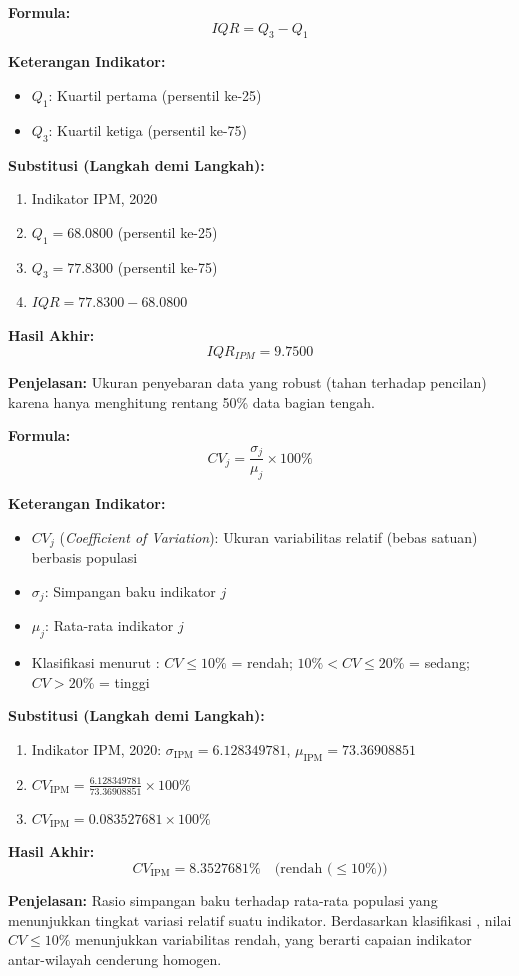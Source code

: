 \documentclass[11pt,a4paper]{article}
\begin{document}
\begin{tcolorbox}[formula_box, title={Jangkauan Interkuartil (IQR)}] \label{kotak:iqr}
\textbf{Formula:}
\[ IQR = Q_3 - Q_1 \]

\textbf{Keterangan Indikator:}
\begin{itemize}
  \item $Q_1$: Kuartil pertama (persentil ke-25)
  \item $Q_3$: Kuartil ketiga (persentil ke-75)
\end{itemize}

\textbf{Substitusi (Langkah demi Langkah):}
\begin{enumerate}
  \item Indikator IPM, 2020
  \item $Q_1 = 68.0800$ (persentil ke-25)
  \item $Q_3 = 77.8300$ (persentil ke-75)
  \item $IQR = 77.8300 - 68.0800$
\end{enumerate}

\textbf{Hasil Akhir:}
\[ IQR_{IPM} = 9.7500 \]

\textbf{Penjelasan:} Ukuran penyebaran data yang robust (tahan terhadap pencilan) karena hanya menghitung rentang 50\% data bagian tengah.
\end{tcolorbox}

\begin{tcolorbox}[formula_box, title={Koefisien Variasi / \textit{Coefficient of Variation} (CV)}] \label{kotak:cv}
\textbf{Formula:}
\[ CV_j = \frac{\sigma_j}{\mu_j} \times 100\% \]

\textbf{Keterangan Indikator:}
\begin{itemize}
  \item $CV_j$ (\textit{Coefficient of Variation}): Ukuran variabilitas relatif (bebas satuan) berbasis populasi
  \item $\sigma_j$: Simpangan baku indikator $j$
  \item $\mu_j$: Rata-rata indikator $j$
  \item Klasifikasi menurut \citet{deptan2003}: $CV \leq 10\%$ = rendah; $10\% < CV \leq 20\%$ = sedang; $CV > 20\%$ = tinggi
\end{itemize}

\textbf{Substitusi (Langkah demi Langkah):}
\begin{enumerate}
  \item Indikator IPM, 2020: $\sigma_{\text{IPM}} = 6.128349781$, $\mu_{\text{IPM}} = 73.36908851$
  \item $CV_{\text{IPM}} = \frac{6.128349781}{73.36908851} \times 100\%$
  \item $CV_{\text{IPM}} = 0.083527681 \times 100\%$
\end{enumerate}

\textbf{Hasil Akhir:}
\[ CV_{\text{IPM}} = 8.3527681\% \quad \text{(rendah ($\leq 10\%$))} \]

\textbf{Penjelasan:} Rasio simpangan baku terhadap rata-rata populasi yang menunjukkan tingkat variasi relatif suatu indikator. Berdasarkan klasifikasi \citet{deptan2003}, nilai $CV \leq 10\%$ menunjukkan variabilitas rendah, yang berarti capaian indikator antar-wilayah cenderung homogen.
\end{tcolorbox}
\end{document}
